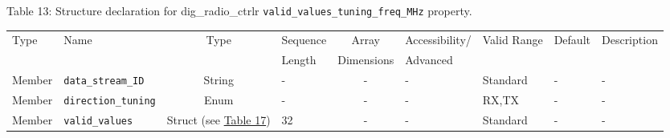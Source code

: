 \documentclass{article}
\def\comp{dig\_radio\_ctrlr}
\begin{document}
\begin{landscape}
	\noindent Table \hypertarget{tab13}{13}: Structure declaration for \comp{} \verb+valid_values_tuning_freq_MHz+ property.
	\begin{scriptsize}
		\noindent\begin{longtable}{|p{1.8cm}|p{3.6cm}|c|p{2cm}|c|p{2cm}|p{1.7cm}|p{0.8cm}|p{4.97cm}|}
			\hline
			\rowcolor{blue}
			Type         & Name                                & Type & Sequence & Array      & Accessibility/ & Valid Range  & Default & Description                                                                                                                                                                                                                       \\
			\rowcolor{blue}
			             &                                     &      & Length   & Dimensions & Advanced       &              &         &                                                                                                                                                                                                                             \\
			\hline
			Member       & \verb+data_stream_ID+               & String& -       & -          & -              & Standard     & -       & - \\
			\hline
			Member       & \verb+direction_tuning+             & Enum  & -       & -          & -              & RX,TX        & -       & - \\
			\hline
			Member       & \verb+valid_values+                 & Struct (see \hyperlink{tab17}{Table 17}) & 32      & -          & -              & Standard & -       & - \\
			\hline
		\end{longtable}
	\end{scriptsize}


\end{landscape}
\end{document}
